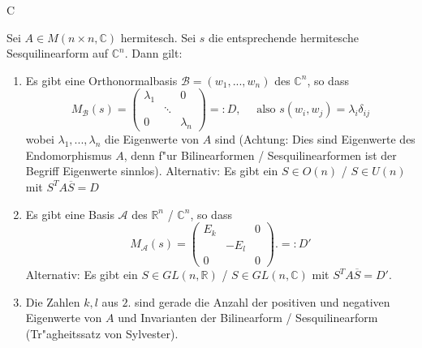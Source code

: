 \documentclass[8pt, a4paper, twocolumn, landscape]{article}
\begin{document}
{C
\begin{theorem} 
Sei $A \in M (n \times n, \mathbb{C} )$ hermitesch. Sei $s$ die entsprechende hermitesche Sesquilinearform auf $\mathbb{C}^n$. Dann gilt:
\begin{enumerate}
\item Es gibt eine Orthonormalbasis $\mathcal{B} = (w_1, ..., w_n)$ des $\mathbb{C}^n$, so dass 
$$
M_\mathcal{B}(s) = \left(\begin{array}{ccc}\lambda_{1} & & 0  
\\ & \ddots & 
\\ 0 & & \lambda_{n}\end{array}\right) =:D, \quad \text{ also } s(w_i, w_j) = \lambda_i \delta_{ij}
$$
wobei $\lambda_1, ..., \lambda_n$ die Eigenwerte von $A$ sind (Achtung: Dies sind Eigenwerte des Endomorphismus $A$, denn f"ur Bilinearformen / Sesquilinearformen ist der Begriff Eigenwerte sinnlos).
Alternativ: Es gibt ein $S \in O(n)$ / $S \in U(n)$ mit $S^T A \overline{S} = D$
\item Es gibt eine Basis $\mathcal{A}$ des  $\mathbb{R}^n$ / $\mathbb{C}^n$, so dass
$$
M_\mathcal{A}(s) =  \left(\begin{array}{ccc}E_k & & 0 
\\ & -E_l & 
\\ 0 & & 0\end{array}\right). =: D' 
$$
Alternativ: Es gibt ein $S \in GL(n, \mathbb{R})$ / $S \in GL(n, \mathbb{C})$ mit $S^T A \overline{S} = D'$.
\item Die Zahlen $k, l$ aus $2.$ sind gerade die Anzahl der positiven und negativen Eigenwerte von $A$ und Invarianten der Bilinearform / Sesquilinearform (Tr"agheitssatz von Sylvester).
\end{enumerate}
\end{theorem}

}
\end{document}
